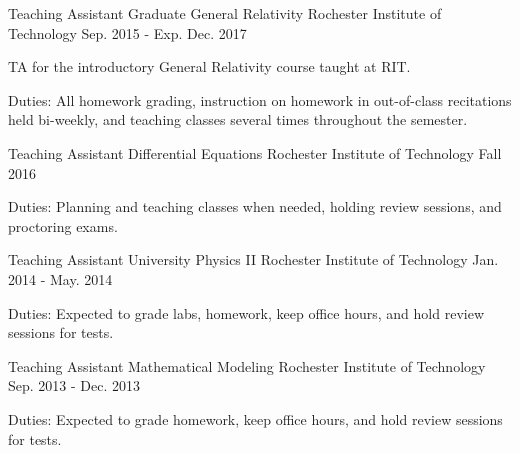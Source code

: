 \begin{cventries}
  \cventry
    {Teaching Assistant}
    {Graduate General Relativity}
    {Rochester Institute of Technology}
    {Sep. 2015 - Exp. Dec. 2017}
    {
      \begin{cvitems}
        \item {TA for the introductory General Relativity course taught at RIT.}
        \item {Duties: All homework grading, instruction on homework in out-of-class recitations held bi-weekly, and teaching classes several times throughout the semester.}
      \end{cvitems}
    }
  \cventry
    {Teaching Assistant}
    {Differential Equations}
    {Rochester Institute of Technology}
    {Fall 2016}
    {
      \begin{cvitems}
        \item {Duties: Planning and teaching classes when needed, holding review sessions, and proctoring exams.}
      \end{cvitems}
    }
 \cventry
    {Teaching Assistant}
    {University Physics II}
    {Rochester Institute of Technology}
    {Jan. 2014 - May. 2014}
    {
      \begin{cvitems}
        \item {Duties: Expected to grade labs, homework, keep office hours, and hold review sessions for tests.}
      \end{cvitems}
    }

  \cventry
    {Teaching Assistant}
    {Mathematical Modeling}
    {Rochester Institute of Technology}
    {Sep. 2013 - Dec. 2013}
    {
      \begin{cvitems}
        \item {Duties: Expected to grade homework, keep office hours, and hold review sessions for tests.}
      \end{cvitems}
    }
\end{cventries}
